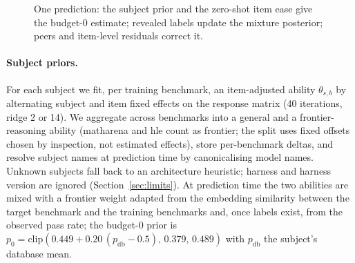 \documentclass{article}
\begin{document}
\begin{figure}[t]
\centering
{}
\caption{One prediction: the subject prior and the zero-shot item ease give the budget-0 estimate; revealed labels update the mixture posterior; peers and item-level residuals correct it.}
\label{fig:pipeline}
\end{figure}

\paragraph{Subject priors.} For each subject we fit, per training benchmark, an item-adjusted ability $\theta_{s,b}$ by alternating subject and item fixed effects on the response matrix (40 iterations, ridge 2 or 14). We aggregate across benchmarks into a general and a frontier-reasoning ability (matharena and hle count as frontier; the split uses fixed offsets chosen by inspection, not estimated effects), store per-benchmark deltas, and resolve subject names at prediction time by canonicalising model names. Unknown subjects fall back to an architecture heuristic; harness and harness version are ignored (Section~\ref{sec:limits}). At prediction time the two abilities are mixed with a frontier weight adapted from the embedding similarity between the target benchmark and the training benchmarks and, once labels exist, from the observed pass rate; the budget-0 prior is $p_0=\text{clip}(0.449+0.20\,(p_{\text{db}}-0.5),\,0.379,\,0.489)$ with $p_{\text{db}}$ the subject's database mean.
\end{document}
